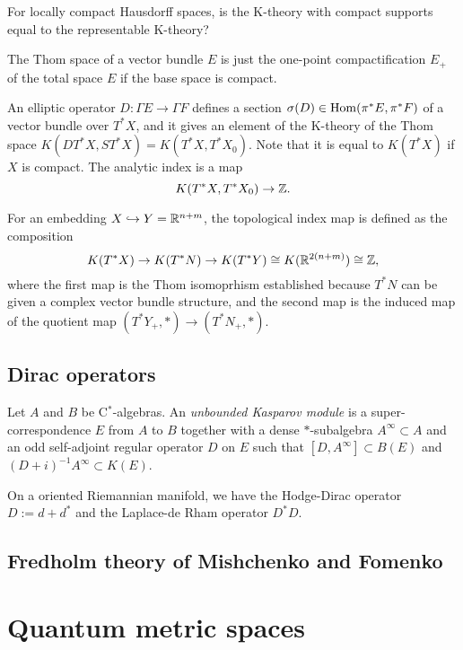 \documentclass{../../large}
\begin{document}
For locally compact Hausdorff spaces, is the K-theory with compact supports equal to the representable K-theory?

The Thom space of a vector bundle $E$ is just the one-point compactification $E_+$ of the total space $E$ if the base space is compact.

An elliptic operator $D:\Gamma E\to\Gamma F$ defines a section $\sigma(D)\in\operatorname{Hom}(\pi^*E,\pi^*F)$ of a vector bundle over $T^*X$, and it gives an element of the K-theory of the Thom space $K(DT^*X,ST^*X)=K(T^*X,T^*X_0)$.
Note that it is equal to $K(T^*X)$ if $X$ is compact.
The analytic index is a map
\[K(T^*X,T^*X_0)\to\mathbb{Z}.\]



For an embedding $X\hookrightarrow Y=\mathbb{R}^{n+m}$, the topological index map is defined as the composition
\[K(T^*X)\to K(T^*N)\to K(T^*Y)\cong K(\mathbb{R}^{2(n+m)})\cong \mathbb{Z},\]
where the first map is the Thom isomoprhism established because $T^*N$ can be given a complex vector bundle structure, and the second map is the induced map of the quotient map $(T^*Y_+,*)\to(T^*N_+,*)$.



\section{Dirac operators}


\begin{prb}
Let $A$ and $B$ be C$^*$-algebras.
An \emph{unbounded Kasparov module} is a super-correspondence $E$ from $A$ to $B$ together with a dense $*$-subalgebra $A^\infty\subset A$ and an odd self-adjoint regular operator $D$ on $E$ such that $[D,A^\infty]\subset B(E)$ and $(D+i)^{-1}A^\infty\subset K(E)$.

On a oriented Riemannian manifold, we have the Hodge-Dirac operator $D:=d+d^*$ and the Laplace-de Rham operator $D^*D$.



\end{prb}


\section{Fredholm theory of Mishchenko and Fomenko}






\chapter{Quantum metric spaces}
\end{document}
